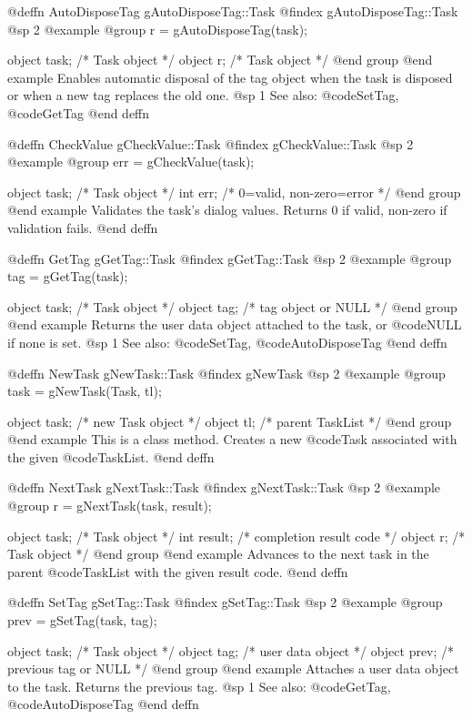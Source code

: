 @deffn {AutoDisposeTag} gAutoDisposeTag::Task
@findex gAutoDisposeTag::Task
@sp 2
@example
@group
r = gAutoDisposeTag(task);

object  task;   /*  Task object  */
object  r;      /*  Task object  */
@end group
@end example
Enables automatic disposal of the tag object when the task is disposed
or when a new tag replaces the old one.
@sp 1
See also:  @code{SetTag}, @code{GetTag}
@end deffn



@deffn {CheckValue} gCheckValue::Task
@findex gCheckValue::Task
@sp 2
@example
@group
err = gCheckValue(task);

object  task;   /*  Task object              */
int     err;    /*  0=valid, non-zero=error  */
@end group
@end example
Validates the task's dialog values.  Returns 0 if valid, non-zero if
validation fails.
@end deffn



@deffn {GetTag} gGetTag::Task
@findex gGetTag::Task
@sp 2
@example
@group
tag = gGetTag(task);

object  task;   /*  Task object          */
object  tag;    /*  tag object or NULL   */
@end group
@end example
Returns the user data object attached to the task, or @code{NULL} if
none is set.
@sp 1
See also:  @code{SetTag}, @code{AutoDisposeTag}
@end deffn



@deffn {NewTask} gNewTask::Task
@findex gNewTask
@sp 2
@example
@group
task = gNewTask(Task, tl);

object  task;   /*  new Task object       */
object  tl;     /*  parent TaskList       */
@end group
@end example
This is a class method.  Creates a new @code{Task} associated with the
given @code{TaskList}.
@end deffn



@deffn {NextTask} gNextTask::Task
@findex gNextTask::Task
@sp 2
@example
@group
r = gNextTask(task, result);

object  task;     /*  Task object              */
int     result;   /*  completion result code   */
object  r;        /*  Task object              */
@end group
@end example
Advances to the next task in the parent @code{TaskList} with the given
result code.
@end deffn



@deffn {SetTag} gSetTag::Task
@findex gSetTag::Task
@sp 2
@example
@group
prev = gSetTag(task, tag);

object  task;    /*  Task object              */
object  tag;     /*  user data object         */
object  prev;    /*  previous tag or NULL     */
@end group
@end example
Attaches a user data object to the task.  Returns the previous tag.
@sp 1
See also:  @code{GetTag}, @code{AutoDisposeTag}
@end deffn



